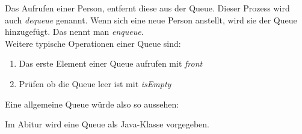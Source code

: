 \begin{flushleft}
    Das Aufrufen einer Person, entfernt diese aus der Queue.
    Dieser Prozess wird auch \textit{dequeue} genannt.
    Wenn sich eine neue Person anstellt, wird sie der Queue hinzugefügt.
    Das nennt man \textit{enqueue}. \\
    Weitere typische Operationen einer Queue sind:
    \begin{enumerate}
        \item {
                Das erste Element einer Queue aufrufen mit \textit{front}
            }
        \item {
                Prüfen ob die Queue leer ist mit \textit{isEmpty}
            }
    \end{enumerate}
    Eine allgemeine Queue würde also so aussehen:
\end{flushleft}

\begin{center}
\end{center}

\begin{flushleft}
    Im Abitur wird eine Queue als Java-Klasse vorgegeben. \\
\end{flushleft}

